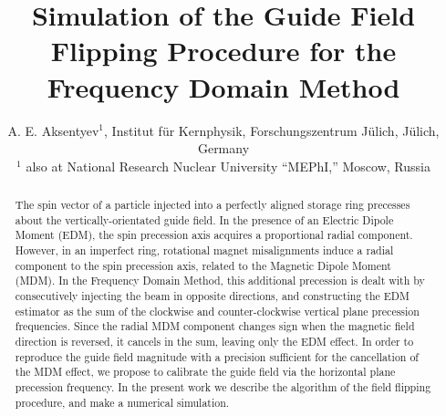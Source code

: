 \documentclass[a4paper]{jacow}
\begin{document}
\title{Simulation of the Guide Field Flipping Procedure for the Frequency Domain Method}
\author{A. E. Aksentyev$^1$\footnotemark[2], Institut f\"ur Kernphysik, Forschungszentrum J\"ulich, J\"ulich, Germany \\$^1$ also at National Research Nuclear University ``MEPhI,'' Moscow, Russia}
\maketitle
{}
\begin{abstract}
  The spin vector of a particle injected into a perfectly aligned storage ring precesses about the vertically-orientated guide field. In the presence of an Electric Dipole Moment (EDM), the spin precession axis acquires a proportional radial component.
  However, in an imperfect ring, rotational magnet misalignments induce a radial component to the spin precession axis, related to the Magnetic Dipole Moment (MDM). In the Frequency Domain Method, this additional precession is dealt with by consecutively injecting the beam in opposite directions, and constructing the EDM estimator as the sum of the clockwise and counter-clockwise vertical plane precession frequencies. Since the radial MDM component changes sign when the magnetic field direction is reversed, it cancels in the sum, leaving only the EDM effect. 
  In order to reproduce the guide field magnitude with a precision sufficient for the cancellation of the MDM effect, we propose to calibrate the guide field via the horizontal plane precession frequency. In the present work we describe the algorithm of the field flipping procedure, and make a numerical simulation.
\end{abstract}
\end{document}
